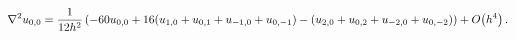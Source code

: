 \[\nabla^{2}u_{0,0}=\frac{1}{12h^{2}}\left(-60u_{0,0}+16(u_{1,0}+u_{0,1}+u_{-1,0%
}+u_{0,-1})-(u_{2,0}+u_{0,2}+u_{-2,0}+u_{0,-2})\right)+\mathop{O\/}\nolimits\!%
\left(h^{4}\right).\]